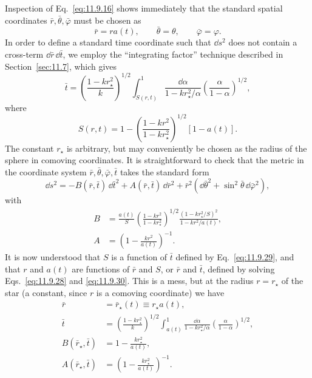 Inspection of Eq.~\eqref{eq:11.9.16} shows immediately that the standard
spatial coordinates \(\bar r,\bar\theta,\bar\varphi\) must be chosen as
\begin{equation}
  \bar r=ra(t),\qquad
  \bar\theta=\theta,\qquad
  \bar\varphi=\varphi.
  \tag{11.9.28}\label{eq:11.9.28}
\end{equation}
In order to define a standard time coordinate such that \(\dd s^2\) does not
contain a cross-term \(\dd\bar r\,\dd\bar t\), we employ the ``integrating
factor'' technique described in Section~\ref{sec:11.7}, which gives
\begin{equation}
  \bar t
  =
  \left(\frac{1-kr_\star^2}{k}\right)^{1/2}
  \int_{S(r,t)}^1
  \frac{\dd\alpha}{1-kr_\star^2/\alpha}
  \left(\frac{\alpha}{1-\alpha}\right)^{1/2},
  \tag{11.9.29}\label{eq:11.9.29}
\end{equation}
where
\begin{equation}
  S(r,t)
  =
  1-
  \left(\frac{1-kr^2}{1-kr_\star^2}\right)^{1/2}
  [1-a(t)].
  \tag{11.9.30}\label{eq:11.9.30}
\end{equation}
The constant \(r_\star\) is arbitrary, but may conveniently be chosen as the
radius of the sphere in comoving coordinates. It is straightforward to check
that the metric in the coordinate system
\(\bar r,\bar\theta,\bar\varphi,\bar t\) takes the standard form
\[
  \dd s^2
  =
  -B(\bar r,\bar t)\,\dd\bar t^2
  +A(\bar r,\bar t)\,\dd\bar r^2
  +\bar r^2(\dd\bar\theta^2+\sin^2\bar\theta\,\dd\bar\varphi^2),
\]
with
\begin{align}
  B
  &=
  \frac{a(t)}{S}
  \left(\frac{1-kr^2}{1-kr_\star^2}\right)^{1/2}
  \frac{(1-kr_\star^2/S)^2}{1-kr^2/a(t)},
  \tag{11.9.31}\label{eq:11.9.31}\\
  A
  &=
  \left(1-\frac{kr^2}{a(t)}\right)^{-1}.
  \tag{11.9.32}\label{eq:11.9.32}
\end{align}
It is now understood that \(S\) is a function of \(\bar t\) defined by
Eq.~\eqref{eq:11.9.29}, and that \(r\) and \(a(t)\) are functions of
\(\bar r\) and \(S\), or \(\bar r\) and \(\bar t\), defined by solving
Eqs.~\eqref{eq:11.9.28} and \eqref{eq:11.9.30}. This is a mess, but at the
radius \(r=r_\star\) of the star (a constant, since \(r\) is a comoving
coordinate) we have
\begin{align}
  \bar r&=\bar r_\star(t)\equiv r_\star a(t),
  \tag{11.9.33}\label{eq:11.9.33}\\
  \bar t
  &=
  \left(\frac{1-kr_\star^2}{k}\right)^{1/2}
  \int_{a(t)}^1
  \frac{\dd\alpha}{1-kr_\star^2/\alpha}
  \left(\frac{\alpha}{1-\alpha}\right)^{1/2},
  \tag{11.9.34}\label{eq:11.9.34}\\
  B(\bar r_\star,\bar t)&=1-\frac{kr_\star^2}{a(t)},
  \tag{11.9.35}\label{eq:11.9.35}\\
  A(\bar r_\star,\bar t)&=
  \left(1-\frac{kr_\star^2}{a(t)}\right)^{-1}.
  \tag{11.9.36}\label{eq:11.9.36}
\end{align}
